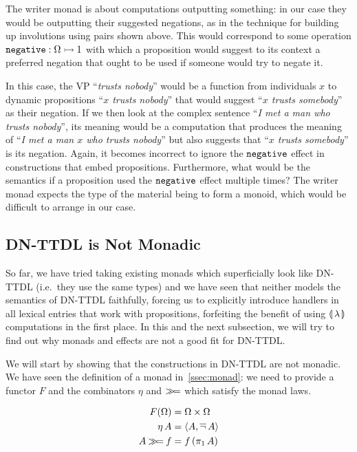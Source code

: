 The writer monad is about computations outputting something: in our case
they would be outputting their suggested negations, as in the technique for
building up involutions using pairs shown above. This would correspond to
some operation $\mathtt{negative} : \Omega \rightarrowtail 1$ with which a proposition
would suggest to its context a preferred negation that ought to be used if
someone would try to negate it.

In this case, the VP ``\emph{trusts nobody}'' would be a function from
individuals $x$ to dynamic propositions ``\emph{$x$ trusts nobody}'' that
would suggest ``\emph{$x$ trusts somebody}'' as their negation. If we then
look at the complex sentence ``\emph{I met a man who trusts nobody}'', its
meaning would be a computation that produces the meaning of ``\emph{I met a
  man $x$ who trusts nobody}'' but also suggests that ``\emph{$x$ trusts
  somebody}'' is its negation. Again, it becomes incorrect to ignore the
$\mathtt{negative}$ effect in constructions that embed
propositions. Furthermore, what would be the semantics if a proposition
used the $\mathtt{negative}$ effect multiple times? The writer monad expects
the type of the material being to form a monoid, which would be difficult
to arrange in our case.


\subsection{DN-TTDL is Not Monadic}

So far, we have tried taking existing monads which superficially look like
DN-TTDL (i.e.\ they use the same types) and we have seen that neither
models the semantics of DN-TTDL faithfully, forcing us to explicitly
introduce handlers in all lexical entries that work with propositions,
forfeiting the benefit of using $\llparenthesis \, \lambda \, \rrparenthesis$ computations in the
first place. In this and the next subsection, we will try to find out why
monads and effects are not a good fit for DN-TTDL.

We will start by showing that the constructions in DN-TTDL are not
monadic. We have seen the definition of a monad in~\ref{ssec:monad}: we
need to provide a functor $F$ and the combinators $\eta$ and $\mathbin{\gg\!=}$
which satisfy the monad laws.

\begin{align*}
  F(\Omega) &= \Omega \times \Omega \\
  \eta\,A &= \left< A, \mathop{\overline{\lnot}} A \right> \\
  A \mathbin{\gg\!=} f &= f\,(\pi_1\,A)
\end{align*}


